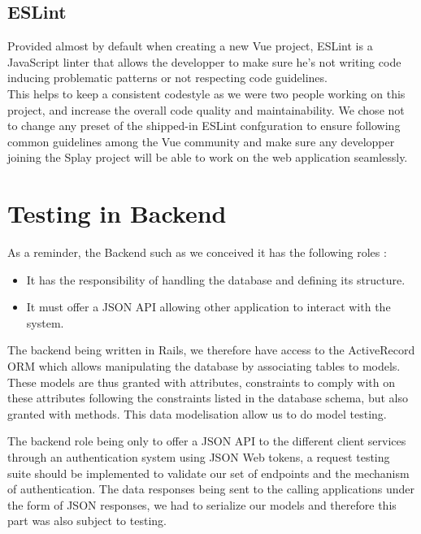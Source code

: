 \documentclass{eplmastersthesis}
\begin{document}
      \subsection{ESLint}

        Provided almost by default when creating a new Vue project, ESLint
        \cite{eslint} is a JavaScript linter that allows the developper to
        make sure he's not writing code inducing problematic patterns or not
        respecting code guidelines.\\
        This helps to keep a consistent codestyle as we were two people working
        on this project, and increase the overall code quality and
        maintainability. We chose not to change any preset of the shipped-in
        ESLint confguration to ensure following common guidelines among the Vue
        community and make sure any developper joining the Splay project will
        be able to work on the web application seamlessly.


    \section{Testing in Backend}

      As a reminder, the Backend such as we conceived it has the following
      roles :

      \begin{itemize}
        \item It has the responsibility of handling the database and
        defining its structure.
        \item It must offer a JSON API allowing other application to interact
        with the system.
      \end{itemize}

      The backend being written in Rails, we therefore have access to the
      ActiveRecord ORM which allows manipulating the database by associating
      tables to models. These models are thus granted with attributes,
      constraints to comply with on these attributes following the constraints
      listed in the database schema, but also granted with methods. This data
      modelisation allow us to do model testing.

      The backend role being only to offer a JSON API to the different client
      services through an authentication system using JSON Web tokens, a
      request testing suite should be implemented to validate our set of
      endpoints and the mechanism of authentication.
      The data responses being sent to the calling applications under the form
      of JSON responses, we had to serialize our models and therefore this
      part was also subject to testing.
\end{document}
